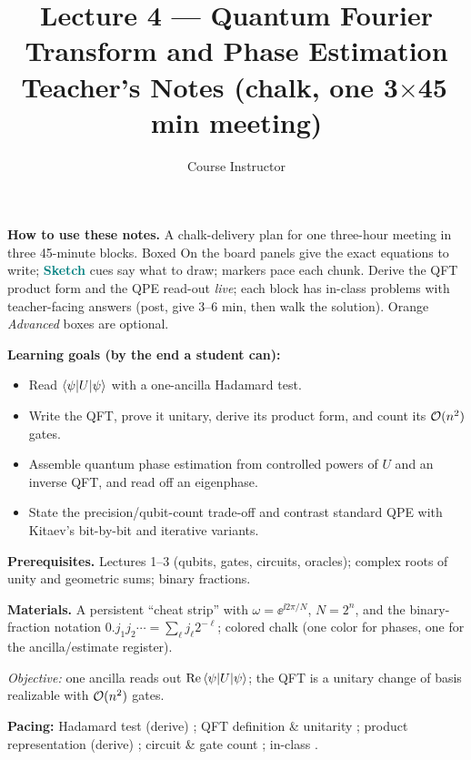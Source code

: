 \documentclass[11pt]{article}
\title{\textbf{Lecture 4 --- Quantum Fourier Transform and Phase Estimation}\\[0.3em]\large Teacher's Notes (chalk, one 3$\times$45\,min meeting)}
\author{Course Instructor}
\date{}
\begin{document}
\maketitle

\noindent\textbf{How to use these notes.} A chalk-delivery plan for one three-hour
meeting in three 45-minute blocks. Boxed \textsf{On the board} panels give the exact
equations to write; \textcolor{teal}{\textbf{Sketch}} cues say what to draw; 
markers pace each chunk. Derive the QFT product form and the QPE read-out \emph{live};
each block has in-class problems with teacher-facing answers (post, give 3--6 min, then
walk the solution). Orange \emph{Advanced} boxes are optional.

\medskip
\noindent\textbf{Learning goals (by the end a student can):}
\begin{itemize}[leftmargin=1.4em,nosep]
  \item Read $\braket{\psi|U|\psi}$ with a one-ancilla Hadamard test.
  \item Write the QFT, prove it unitary, derive its product form, and count its $\mathcal{O}(n^2)$ gates.
  \item Assemble quantum phase estimation from controlled powers of $U$ and an inverse QFT, and read off an eigenphase.
  \item State the precision/qubit-count trade-off and contrast standard QPE with Kitaev's bit-by-bit and iterative variants.
\end{itemize}

\medskip
\noindent\textbf{Prerequisites.} Lectures 1--3 (qubits, gates, circuits, oracles);
complex roots of unity and geometric sums; binary fractions.

\medskip
\noindent\textbf{Materials.} A persistent ``cheat strip'' with $\omega=\ee^{\ii2\pi/N}$,
$N=2^n$, and the binary-fraction notation $0.j_1j_2\cdots=\sum_\ell j_\ell 2^{-\ell}$;
colored chalk (one color for phases, one for the ancilla/estimate register).

\noindent\emph{Objective:} one ancilla reads out $\mathrm{Re}\braket{\psi|U|\psi}$;
the QFT is a unitary change of basis realizable with $\mathcal{O}(n^2)$ gates.

\medskip
\noindent\textbf{Pacing:} Hadamard test (derive) ; QFT definition \&
unitarity ; product representation (derive) ; circuit \& gate
count ; in-class .
\end{document}
